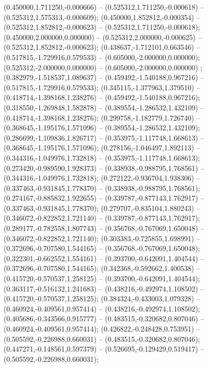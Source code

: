  (0.450000,1.711250,-0.000666) -- (0.525312,1.711250,-0.000618) -- (0.525312,1.575313,-0.000609);
 (0.450000,1.852812,-0.000354) -- (0.525312,1.852812,-0.000623) -- (0.525312,1.711250,-0.000618);
 (0.450000,2.000000,0.000000) -- (0.525312,2.000000,-0.000625) -- (0.525312,1.852812,-0.000623);
 (0.438637,-1.712101,0.663546) -- (0.517815,-1.729916,0.579533) -- (0.605000,-2.000000,0.000000);
 (0.525312,-2.000000,0.000000) -- (0.605000,-2.000000,0.000000) ;
 (0.382979,-1.518537,1.089637) -- (0.459492,-1.540188,0.967216) -- (0.517815,-1.729916,0.579533);
 (0.345115,-1.377963,1.379510) -- (0.418714,-1.398168,1.238276) -- (0.459492,-1.540188,0.967216);
 (0.318550,-1.269848,1.582878) -- (0.389554,-1.286532,1.432109) -- (0.418714,-1.398168,1.238276);
 (0.299758,-1.182779,1.726740) -- (0.368645,-1.195176,1.571096) -- (0.389554,-1.286532,1.432109);
 (0.286699,-1.109836,1.826717) -- (0.353975,-1.117748,1.668613) -- (0.368645,-1.195176,1.571096);
 (0.278156,-1.046497,1.892113) -- (0.344316,-1.049976,1.732818) -- (0.353975,-1.117748,1.668613);
 (0.273420,-0.989590,1.928373) -- (0.338938,-0.988795,1.768561) -- (0.344316,-1.049976,1.732818);
 (0.272122,-0.936704,1.938306) -- (0.337463,-0.931845,1.778370) -- (0.338938,-0.988795,1.768561);
 (0.274167,-0.885832,1.922655) -- (0.339787,-0.877143,1.762917) -- (0.337463,-0.931845,1.778370);
 (0.279707,-0.835104,1.880243) -- (0.346072,-0.822852,1.721140) -- (0.339787,-0.877143,1.762917);
 (0.289177,-0.782558,1.807743) -- (0.356768,-0.767069,1.650048) -- (0.346072,-0.822852,1.721140);
 (0.303383,-0.725855,1.698991) -- (0.372696,-0.707580,1.544165) -- (0.356768,-0.767069,1.650048);
 (0.322301,-0.662552,1.554161) -- (0.393700,-0.642091,1.404544) -- (0.372696,-0.707580,1.544165);
 (0.342368,-0.592662,1.400538) -- (0.415720,-0.570537,1.258125) -- (0.393700,-0.642091,1.404544);
 (0.363117,-0.516132,1.241683) -- (0.438216,-0.492974,1.108502) -- (0.415720,-0.570537,1.258125);
 (0.384324,-0.433003,1.079328) -- (0.460924,-0.409561,0.957414) -- (0.438216,-0.492974,1.108502);
 (0.405686,-0.343566,0.915777) -- (0.483515,-0.320682,0.807046) -- (0.460924,-0.409561,0.957414);
 (0.426822,-0.248428,0.753951) -- (0.505592,-0.226988,0.660031) -- (0.483515,-0.320682,0.807046);
 (0.447271,-0.148561,0.597379) -- (0.526695,-0.129429,0.519417) -- (0.505592,-0.226988,0.660031);
